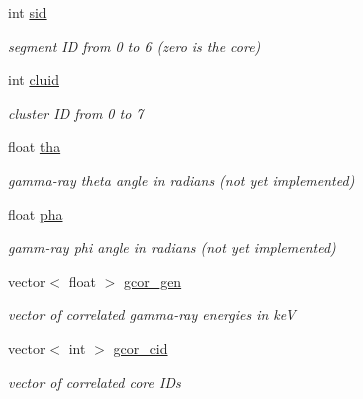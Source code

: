 \begin{DoxyCompactItemize}
int \hyperlink{classg__clx_a04f33012ec56804fca6978885732bc8f}{sid}
\begin{DoxyCompactList}\small\item\em segment ID from 0 to 6 (zero is the core) \end{DoxyCompactList}\item 
\mbox{\label{classg__clx_af057b9309517174aa3f45d0357b594e0}} 
int \hyperlink{classg__clx_af057b9309517174aa3f45d0357b594e0}{cluid}
\begin{DoxyCompactList}\small\item\em cluster ID from 0 to 7 \end{DoxyCompactList}\item 
\mbox{\label{classg__clx_a1add23d784b2694a2f680b855480d95f}} 
float \hyperlink{classg__clx_a1add23d784b2694a2f680b855480d95f}{tha}
\begin{DoxyCompactList}\small\item\em gamma-\/ray theta angle in radians (not yet implemented) \end{DoxyCompactList}\item 
\mbox{\label{classg__clx_affd7b8c1191e11bab79d77dfb4f16a63}} 
float \hyperlink{classg__clx_affd7b8c1191e11bab79d77dfb4f16a63}{pha}
\begin{DoxyCompactList}\small\item\em gamm-\/ray phi angle in radians (not yet implemented) \end{DoxyCompactList}\item 
\mbox{\label{classg__clx_ae3b41efe9dfca0e33b8bba9e737ee421}} 
vector$<$ float $>$ \hyperlink{classg__clx_ae3b41efe9dfca0e33b8bba9e737ee421}{gcor\+\_\+gen}
\begin{DoxyCompactList}\small\item\em vector of correlated gamma-\/ray energies in keV \end{DoxyCompactList}\item 
\mbox{\label{classg__clx_a0aed9e2ec9d94795c86a00c51d940652}} 
vector$<$ int $>$ \hyperlink{classg__clx_a0aed9e2ec9d94795c86a00c51d940652}{gcor\+\_\+cid}
\begin{DoxyCompactList}\small\item\em vector of correlated core I\+Ds \end{DoxyCompactList}\item 

\end{DoxyCompactItemize}
